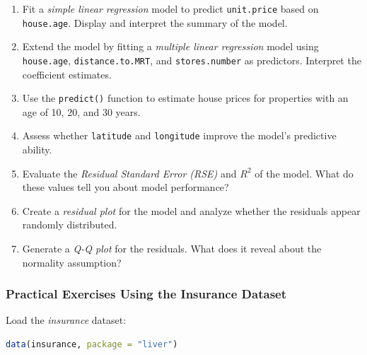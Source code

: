 \documentclass[
  11pt,
]{book}
\newcommand{\passthrough}[1]{#1}
\providecommand{\tightlist}{%
  \setlength{\itemsep}{0pt}\setlength{\parskip}{0pt}}
\theoremstyle{definition}
\theoremstyle{definition}
\theoremstyle{definition}
\theoremstyle{definition}
\theoremstyle{remark}
\begin{document}
\begin{enumerate}
\def\labelenumi{\arabic{enumi}.}
\setcounter{enumi}{7}
\tightlist
\item
  Fit a \emph{simple linear regression} model to predict \passthrough{\lstinline!unit.price!} based on \passthrough{\lstinline!house.age!}. Display and interpret the summary of the model.\\
\item
  Extend the model by fitting a \emph{multiple linear regression} model using \passthrough{\lstinline!house.age!}, \passthrough{\lstinline!distance.to.MRT!}, and \passthrough{\lstinline!stores.number!} as predictors. Interpret the coefficient estimates.\\
\item
  Use the \passthrough{\lstinline!predict()!} function to estimate house prices for properties with an age of 10, 20, and 30 years.\\
\item
  Assess whether \passthrough{\lstinline!latitude!} and \passthrough{\lstinline!longitude!} improve the model's predictive ability.\\
\item
  Evaluate the \emph{Residual Standard Error (RSE)} and \emph{\(R^2\)} of the model. What do these values tell you about model performance?\\
\item
  Create a \emph{residual plot} for the model and analyze whether the residuals appear randomly distributed.\\
\item
  Generate a \emph{Q-Q plot} for the residuals. What does it reveal about the normality assumption?
\end{enumerate}

\subsubsection*{Practical Exercises Using the Insurance Dataset}\label{practical-exercises-using-the-insurance-dataset}


Load the \emph{insurance} dataset:

\begin{lstlisting}[language=R]
data(insurance, package = "liver")
\end{lstlisting}
\end{document}
